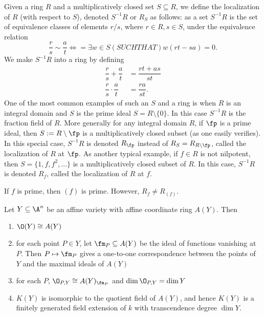 Given a ring $R$ and a multiplicatively closed set $S \subseteq R$, we define the localization of $R$ (with respect to $S$), denoted $S^{-1}R$ or $R_S$ as follows: as a set $S^{-1}R$ is the set of equivalence classes of elements $r/s$, where $r \in R, s \in S$, under the equivalence relation
	\[
	\dfrac{r}{s} \sim \dfrac{a}{t} \Leftrightarrow= \exists w \in S (SUCH THAT) w(rt-sa)=0.
	\]
We make $S^{-1}R$ into a ring by defining
	\[
	\begin{split}
	\dfrac{r}{s} + \dfrac{a}{t}&= \dfrac{rt+as}{st} \\
	\dfrac{r}{s} \cdot \dfrac{a}{t}&= \dfrac{ra}{st}.
	\end{split}
	\]
One of the most common examples of such an $S$ and a ring is when $R$ is an integral domain and $S$ is the prime ideal $S= R \setminus \{0\}$. In this case $S^{-1}R$ is the fraction field of $R$. More generally for any integral domain $R$, if $\fp$ is a prime ideal, then $S:= R \setminus \fp$ is a multiplicatively closed subset (as one easily verifies). In this special case, $S^{-1}R$ is denoted $R_\fp$ instead of $R_S= R_{R \setminus \fp}$, called the localization of $R$ at $\fp$. As another typical example, if $f \in R$ is not nilpotent, then $S= \{1,f,f^2,\ldots\}$ is a multiplicatively closed subset of $R$. In this case, $S^{-1}R$ is denoted $R_f$, called the localization of $R$ at $f$.


\begin{rem}
If $f$ is prime, then $(f)$ is prime. However, $R_f \neq R_{(f)}$. 
\end{rem}


\begin{thm}
Let $Y \subseteq \A^n$ be an affine variety with affine coordinate ring $A(Y)$. Then
\begin{enumerate}
\item $\O(Y) \cong A(Y)$
\item for each point $P \in Y$, let $\fm_P \subseteq A(Y)$ be the ideal of functions vanishing at $P$. Then $P \mapsto \fm_P$ gives a one-to-one correspondence between the points of $Y$ and the maximal ideals of $A(Y)$
\item for each $P$, $\O_{P,Y} \cong A(Y)_{\fm_P}$ and $\dim \O_{P,Y}= \dim Y$
\item $K(Y)$ is isomorphic to the quotient field of $A(Y)$, and hence $K(Y)$ is a finitely generated field extension of $k$ with transcendence degree $\dim Y$. 
\end{enumerate}
\end{thm}


